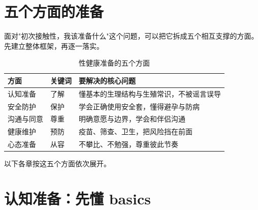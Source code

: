 \documentclass[12pt,UTF8,openany]{ctexbook}
\begin{document}
\chapter{五个方面的准备}

面对"初次接触性，我该准备什么"这个问题，可以把它拆成五个相互支撑的方面。
先建立整体框架，再逐一落实。

\begin{table}[htbp]
  \centering
  \caption{性健康准备的五个方面}
  \begin{tabularx}{\textwidth}{@{}l l X@{}}
    \toprule
    \textbf{方面} & \textbf{关键词} & \textbf{要解决的核心问题} \\
    \midrule
    认知准备   & 了解       & 懂基本的生理结构与生殖常识，不被谣言误导 \\
    安全防护   & 保护       & 学会正确使用安全套，懂得避孕与防病 \\
    沟通与同意 & 尊重       & 明确意愿与边界，学会和伴侣沟通 \\
    健康维护   & 预防       & 疫苗、筛查、卫生，把风险挡在前面 \\
    心态准备   & 从容       & 不攀比、不勉强，尊重彼此节奏 \\
    \bottomrule
  \end{tabularx}
\end{table}

以下各章按这五个方面依次展开。

\chapter{认知准备：先懂 basics}
\end{document}

